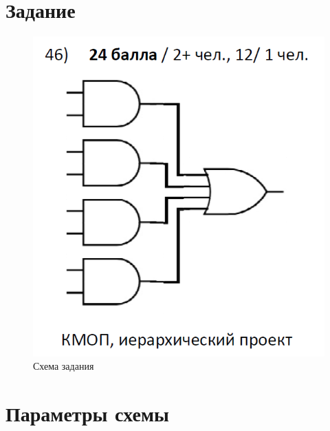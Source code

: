\documentclass[a4paper,14pt]{article}
\begin{document}

\tableofcontents
\pagebreak

\section{Задание}

\begin{figure}[H]
	\centering		
	\includegraphics[width=0.4\linewidth]{image/schema_task}
	\caption{Схема задания}\label{img:schema_task}
\end{figure}

\section{Параметры схемы}
\end{document}

